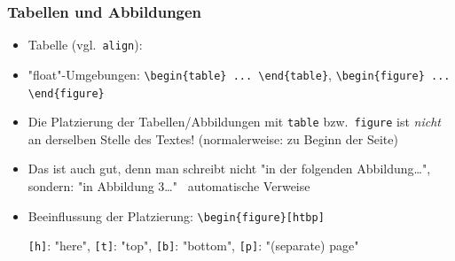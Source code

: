 \begin{frame}[<+->][fragile]
	\frametitle{Tabellen und Abbildungen}
	\begin{itemize}
		\item Tabelle (vgl.\ \lstinline!align!):
		
		\item "float"-Umgebungen: \lstinline!\begin{table} ... \end{table}!, \lstinline!\begin{figure} ... \end{figure}!
		\item Die Platzierung der Tabellen/Abbildungen mit \lstinline!table! bzw.\ \lstinline!figure! ist \emph{nicht} an derselben Stelle des Textes! (normalerweise: zu Beginn der Seite)
		\item Das ist auch gut, denn man schreibt nicht "in der folgenden Abbildung\dots", sondern: "in Abbildung 3\dots" \textrightarrow\ automatische Verweise
		\item Beeinflussung der Platzierung: \lstinline!\begin{figure}[htbp]!
		
		\lstinline![h]!: "here", \lstinline![t]!: "top", \lstinline![b]!: "bottom", \lstinline![p]!: "(separate) page"
	\end{itemize}
\end{frame}


